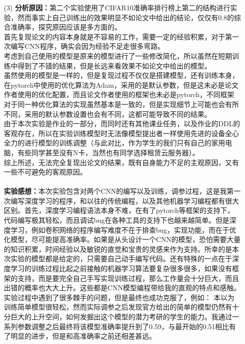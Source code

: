 \documentclass[a4paper,UTF8]{article}
\numberwithin{equation}{section}
\begin{document}
\begin{enumerate}
\item [(3)]
\textbf{分析原因：}第二个实验使用了CIFAR10准确率排行榜上第二的结构进行实验，然而事实上自己训练出的效果明显不如论文中给出的结论，仅仅有$0.8$的综合准确率，探究原因应该是多方面的。\\
首先复现论文的内容本身就是不容易的工作，需要一定的经验积累，对于第一次编写CNN程序，确实会因为经验不足走很多弯路。\\
考虑到自己使用的模型是原来的模型进行了一些修改简化，所以虽然在短期训练中得到了不错的结果，但是长远来看效果不如论文中给出的模型。\\
虽然使用的模型是一样的，但是复现过程不仅仅是搭建模型，还有训练本身，在pytorch中使用的优化算法为Adam，采用的是默认参数，但是这未必是论文作者使用的优化配置，而且论文作者使用的框架也未必是pytorch，不同框架对于同一种优化算法的实现虽然基本是一致的，但是实现细节上可能也会有所不同，采用的默认参数设置也会有不同，这都可能导致不同的结果。\\
由于本次实验是作业的一部分，而同时还有其他课业任务，以及作业的DDL的客观存在，所以在实验训练模型时无法像模型提出者一样使用先进的设备全心全力的进行模型的训练调整（与此对比，作为学生的我们只有自己的家用电脑，有些同学甚至没有N卡，当然也有同学选择租赁云服务器）。\\
综上所述，无法完全复现出论文的结果，既有自身能力不足的主观原因，又有一些不可避免的客观原因。\\\\
\textbf{实验感想：}本次实验包含对两个CNN的编写以及训练，调参过程，这是我第一次编写深度学习的程序，和以往的传统编程，以及其他机器学习编程都有很大区别。首先，深度学习编程语法本身不难，在有了pytorch等框架的支持下，代码编写极其轻松，而且调试bug在各种工具的支持下也越来越简单。但是深度学习，例如卷积网络的程序编写难度不在于排查bug，实现功能，而在于优化模型，尽可能提高准确率。如果是从头设计一个CNN的模型，恐怕需要大量的知识积累，时间经验以及敏锐的直觉和宝贵的灵感来作为支持。所幸的是本次实验的模型都是给定的，只需要自己动手编写代码。还有特殊的一点在于深度学习的训练过程比起之前接触的机器学习算法要复杂很多很多，如果没有框架的支持，而是要完全自己手写实现训练过程，那么工作量会十分巨大，而且出错的概率也大大上升。这些都是CNN模型编程带给我的直观的特点和感触。\\
实验过程中遇到了很多棘手的问题，但是最终也成功克服了，例如：
本以为训练简单模型很轻松，然而实际调参之后发现官方给出的简单的模型仍然有十分巨大的上升空间，如何发掘出这个模型的潜力考研的学生的能力。我通过一系列参数调整之后最终将该模型准确率提升到了0.59，与最开始的0.51相比有了明显的进步，但是和高准确率之前还相差甚远。\\

\end{enumerate}
\end{document}
